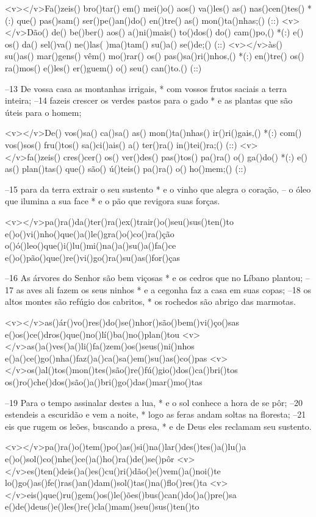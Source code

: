 <v></v>Fa()zeis() bro()tar() em() mei()o() aos() va()les() as() nas()cen()tes() *(:)
que() pas()sam() ser()pe()an()do() en()tre() as() mon()ta()nhas;() (::)
<v></v>Dão() de() be()ber() aos() a()ni()mais() to()dos() do() cam()po,() *(:)
e() os() da() sel()va() ne()las( )ma()tam() su()a() se()de;() (::)
<v></v>às() su()as() mar()gens() vêm() mo()rar() os() pas()sa()ri()nhos,() *(:)
en()tre() os() ra()mos() e()les() er()guem() o() seu() can()to.() (::)

–13 De vossa casa as montanhas irrigais, *
com vossos frutos saciais a terra inteira;
–14 fazeis crescer os verdes pastos para o gado *
e as plantas que são úteis para o homem;

<v></v>De() vos()sa() ca()sa() as() mon()ta()nhas() ir()ri()gais,() *(:)
com() vos()sos() fru()tos() sa()ci()ais() a() ter()ra() in()tei()ra;() (::)
<v></v>fa()zeis() cres()cer() os() ver()des() pas()tos() pa()ra() o() ga()do() *(:)
e() as() plan()tas() que() são() ú()teis() pa()ra() o() ho()mem;() (::)

–15 para da terra extrair o seu sustento *
e o vinho que alegra o coração,
– o óleo que ilumina a sua face *
e o pão que revigora suas forças.

<v></v>pa()ra()da()ter()ra()ex()trair()o()seu()sus()ten()to
e()o()vi()nho()que()a()le()gra()o()co()ra()ção
o()ó()leo()que()i()lu()mi()na()a()su()a()fa()ce
e()o()pão()que()re()vi()go()ra()su()as()for()ças

–16 As árvores do Senhor são bem viçosas *
e os cedros que no Líbano plantou;
–17 as aves ali fazem os seus ninhos *
e a cegonha faz a casa em suas copas;
–18 os altos montes são refúgio dos cabritos, *
os rochedos são abrigo das marmotas.

<v></v>as()ár()vo()res()do()se()nhor()são()bem()vi()ço()sas
e()os()ce()dros()que()no()lí()ba()no()plan()tou
<v></v>as()a()ves()a()li()fa()zem()os()seus()ni()nhos
e()a()ce()go()nha()faz()a()ca()sa()em()su()as()co()pas
<v></v>os()al()tos()mon()tes()são()re()fú()gio()dos()ca()bri()tos
os()ro()che()dos()são()a()bri()go()das()mar()mo()tas

–19 Para o tempo assinalar destes a lua, *
e o sol conhece a hora de se pôr;
–20 estendeis a escuridão e vem a noite, *
logo as feras andam soltas na floresta;
–21 eis que rugem os leões, buscando a presa, *
e de Deus eles reclamam seu sustento.

<v></v>pa()ra()o()tem()po()as()si()na()lar()des()tes()a()lu()a
e()o()sol()co()nhe()ce()a()ho()ra()de()se()pôr
<v></v>es()ten()deis()a()es()cu()ri()dão()e()vem()a()noi()te
lo()go()as()fe()ras()an()dam()sol()tas()na()flo()res()ta
<v></v>eis()que()ru()gem()os()le()ões()bus()can()do()a()pre()sa
e()de()deus()e()les()re()cla()mam()seu()sus()ten()to


